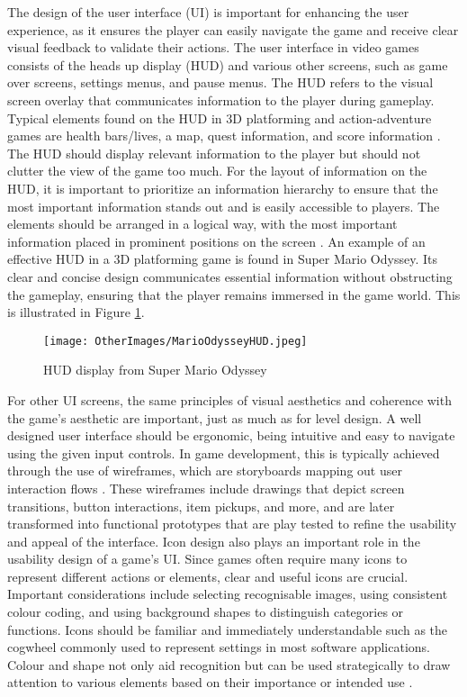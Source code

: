 \documentclass[10pt]{final_report}
\begin{document}
The design of the user interface (UI) is important for enhancing the user experience, as it ensures the player can easily navigate the game and receive clear visual feedback to validate their actions. The user interface in video games consists of the heads up display (HUD) and various other screens, such as game over screens, settings menus, and pause menus. The HUD refers to the visual screen overlay that communicates information to the player during gameplay. Typical elements found on the HUD in 3D platforming and action-adventure games are health bars/lives, a map, quest information, and score information \cite{Rogers2014}. The HUD should display relevant information to the player but should not clutter the view of the game too much. For the layout of information on the HUD, it is important to prioritize an information hierarchy to ensure that the most important information stands out and is easily accessible to players. The elements should be arranged in a logical way, with the most important information placed in prominent positions on the screen \cite{Hive}. An example of an effective HUD in a 3D platforming game is found in Super Mario Odyssey. Its clear and concise design communicates essential information without obstructing the gameplay, ensuring that the player remains immersed in the game world. This is illustrated in Figure \ref{fig:MarioHUD}.

\begin{figure}[H]
    \centering
    \texttt{[image: OtherImages/MarioOdysseyHUD.jpeg]}
    \caption{HUD display from Super Mario Odyssey}
    \label{fig:MarioHUD}
\end{figure}

For other UI screens, the same principles of visual aesthetics and coherence with the game’s aesthetic are important, just as much as for level design. A well designed user interface should be ergonomic, being intuitive and easy to navigate using the given input controls. In game development, this is typically achieved through the use of wireframes, which are storyboards mapping out user interaction flows \cite{Rogers2014}. These wireframes include drawings that depict screen transitions, button interactions, item pickups, and more, and are later transformed into functional prototypes that are play tested to refine the usability and appeal of the interface.\newline
Icon design also plays an important role in the usability design of a game's UI. Since games often require many icons to represent different actions or elements, clear and useful icons are crucial. Important considerations include selecting recognisable images, using consistent colour coding, and using background shapes to distinguish categories or functions. Icons should be familiar and immediately understandable such as the cogwheel commonly used to represent settings in most software applications. Colour and shape not only aid recognition but can be used strategically to draw attention to various elements based on their importance or intended use \cite{Rogers2014}.
\end{document}
